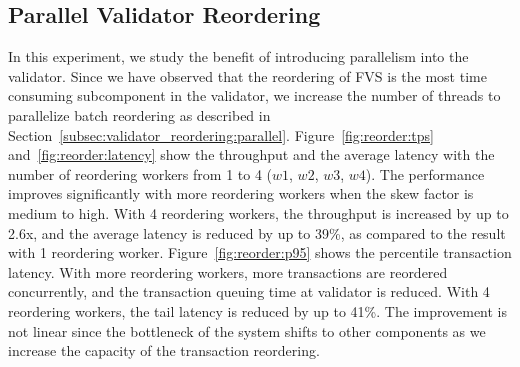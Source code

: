 \subsection{Parallel Validator Reordering}
In this experiment, we study the benefit of introducing parallelism into the validator. Since we have observed that the reordering of FVS is the most time consuming subcomponent in the validator, we increase the number of threads to parallelize batch reordering as described in Section~\ref{subsec:validator_reordering:parallel}. 
Figure~\ref{fig:reorder:tps} and~\ref{fig:reorder:latency} show the throughput
and the average latency with the number of reordering workers from 1 to 4
($w1$, $w2$, $w3$, $w4$). The performance improves significantly with more reordering workers when the skew factor is medium to high. With 4 reordering workers, the throughput is increased by up to 2.6x, and the average latency is reduced by up to 39\%, as compared to the result with 1 reordering worker. Figure~\ref{fig:reorder:p95} shows the percentile transaction latency. With more reordering workers, more transactions are reordered concurrently, and the transaction queuing time at validator is reduced. With 4 reordering workers, the tail latency is reduced by up to 41\%. The improvement is not linear since the bottleneck of the system shifts to other
components as we increase the capacity of the transaction reordering.

